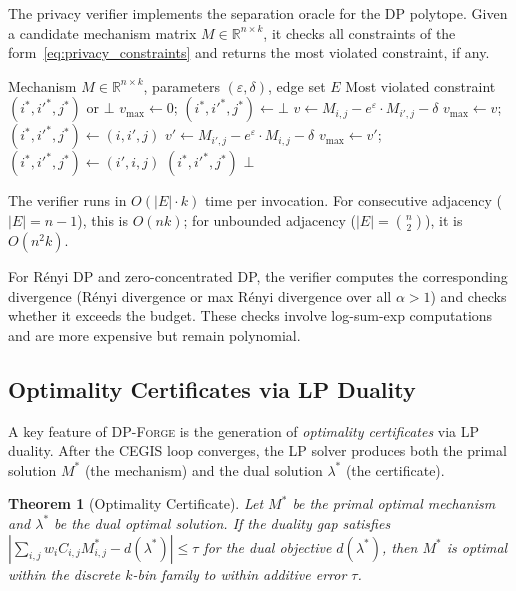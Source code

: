 \documentclass[11pt,a4paper]{article}
\newcommand{\dpforge}{\textsc{DP-Forge}}
\newcommand{\eps}{\varepsilon}
\newcommand{\R}{\mathbb{R}}
\newtheorem{theorem}{Theorem}[section]
\begin{document}
The privacy verifier implements the separation oracle for the DP polytope.
Given a candidate mechanism matrix $M \in \R^{n \times k}$, it checks all
constraints of the form~\eqref{eq:privacy_constraints} and returns the most
violated constraint, if any.

\begin{algorithm}[t]
\caption{Privacy Verifier (Separation Oracle)}
\label{alg:verifier}
\begin{algorithmic}[1]
\Require Mechanism $M \in \R^{n \times k}$, parameters $(\eps, \delta)$, edge set $E$
\Ensure Most violated constraint $(i^*, i'^*, j^*)$ or $\bot$
\State $v_{\max} \gets 0$; $(i^*, i'^*, j^*) \gets \bot$
    \State $v \gets M_{i,j} - e^{\eps} \cdot M_{i',j} - \delta$
      \State $v_{\max} \gets v$; $(i^*, i'^*, j^*) \gets (i, i', j)$
    \EndIf
    \State $v' \gets M_{i',j} - e^{\eps} \cdot M_{i,j} - \delta$
      \State $v_{\max} \gets v'$; $(i^*, i'^*, j^*) \gets (i', i, j)$
    \EndIf
  \EndFor
\EndFor
{} 
  \State \Return $(i^*, i'^*, j^*)$
\Else
  \State \Return $\bot$
\EndIf
\end{algorithmic}
\end{algorithm}

The verifier runs in $O(|E| \cdot k)$ time per invocation.  For consecutive
adjacency ($|E| = n - 1$), this is $O(nk)$; for unbounded adjacency
($|E| = \binom{n}{2}$), it is $O(n^2 k)$.

For R\'enyi DP and zero-concentrated DP, the verifier computes the corresponding
divergence (R\'enyi divergence or max R\'enyi divergence over all $\alpha > 1$)
and checks whether it exceeds the budget.  These checks involve log-sum-exp
computations and are more expensive but remain polynomial.

\subsection{Optimality Certificates via LP Duality}
\label{subsec:certificates}

A key feature of \dpforge{} is the generation of \emph{optimality certificates}
via LP duality.  After the CEGIS loop converges, the LP solver produces both
the primal solution $M^*$ (the mechanism) and the dual solution $\lambda^*$
(the certificate).

\begin{theorem}[Optimality Certificate]
\label{thm:certificate}
Let $M^*$ be the primal optimal mechanism and $\lambda^*$ be the dual optimal
solution.  If the duality gap satisfies
$|\sum_{i,j} w_i C_{i,j} M^*_{i,j} - d(\lambda^*)| \le \tau$
for the dual objective $d(\lambda^*)$, then $M^*$ is optimal within the discrete
$k$-bin family to within additive error $\tau$.
\end{theorem}
\end{document}
